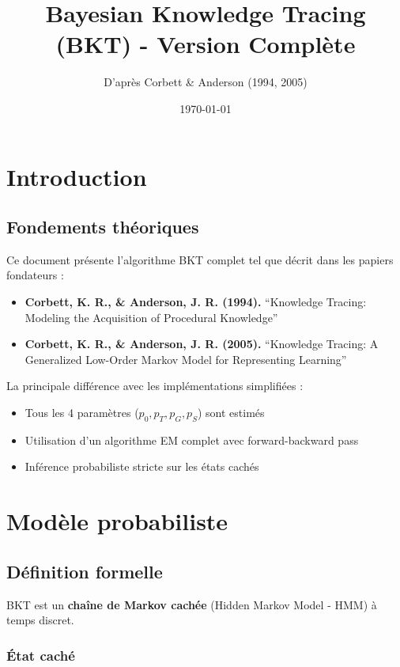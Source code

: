 \documentclass[12pt]{article}
\title{\textbf{Bayesian Knowledge Tracing (BKT) - Version Complète}}
\author{D'après Corbett \& Anderson (1994, 2005)}
\date{\today}
\begin{document}
\maketitle

\tableofcontents

\newpage

\section{Introduction}

\subsection{Fondements théoriques}

Ce document présente l'algorithme BKT complet tel que décrit dans les papiers fondateurs :
\begin{itemize}
    \item \textbf{Corbett, K. R., \& Anderson, J. R. (1994).} ``Knowledge Tracing: Modeling the Acquisition of Procedural Knowledge''
    \item \textbf{Corbett, K. R., \& Anderson, J. R. (2005).} ``Knowledge Tracing: A Generalized Low-Order Markov Model for Representing Learning''
\end{itemize}

La principale différence avec les implémentations simplifiées :
\begin{itemize}
    \item Tous les 4 paramètres ($p_0, p_T, p_G, p_S$) sont estimés
    \item Utilisation d'un algorithme EM complet avec forward-backward pass
    \item Inférence probabiliste stricte sur les états cachés
\end{itemize}

\newpage

\section{Modèle probabiliste}

\subsection{Définition formelle}

BKT est un \textbf{chaîne de Markov cachée} (Hidden Markov Model - HMM) à temps discret.

\subsubsection{État caché}
\end{document}
